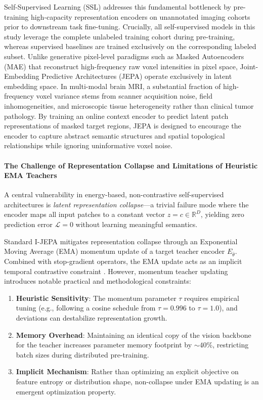\documentclass{article}
\begin{document}
Self-Supervised Learning (SSL) addresses this fundamental bottleneck by pre-training high-capacity representation encoders on unannotated imaging cohorts prior to downstream task fine-tuning. Crucially, all self-supervised models in this study leverage the complete unlabeled training cohort during pre-training, whereas supervised baselines are trained exclusively on the corresponding labeled subset. Unlike generative pixel-level paradigms such as Masked Autoencoders (MAE) \citep{he2022masked} that reconstruct high-frequency raw voxel intensities in pixel space, Joint-Embedding Predictive Architectures (JEPA) \citep{assran2023ijepa} operate exclusively in latent embedding space. In multi-modal brain MRI, a substantial fraction of high-frequency voxel variance stems from scanner acquisition noise, field inhomogeneities, and microscopic tissue heterogeneity rather than clinical tumor pathology. By training an online context encoder to predict latent patch representations of masked target regions, JEPA is designed to encourage the encoder to capture abstract semantic structures and spatial topological relationships while ignoring uninformative voxel noise.

\paragraph{The Challenge of Representation Collapse and Limitations of Heuristic EMA Teachers}
A central vulnerability in energy-based, non-contrastive self-supervised architectures is \emph{latent representation collapse}---a trivial failure mode where the encoder maps all input patches to a constant vector $z = c \in \mathbb{R}^D$, yielding zero prediction error $\mathcal{L} = 0$ without learning meaningful semantics. 

Standard I-JEPA \citep{assran2023ijepa} mitigates representation collapse through an Exponential Moving Average (EMA) momentum update of a target teacher encoder $E_{\bar{\theta}}$. Combined with stop-gradient operators, the EMA update acts as an implicit temporal contrastive constraint \citep{grill2020bootstrap,assran2023ijepa}. However, momentum teacher updating introduces notable practical and methodological constraints:
\begin{enumerate}
    \item \textbf{Heuristic Sensitivity}: The momentum parameter $\tau$ requires empirical tuning (e.g., following a cosine schedule from $\tau=0.996$ to $\tau=1.0$), and deviations can destabilize representation growth.
    \item \textbf{Memory Overhead}: Maintaining an identical copy of the vision backbone for the teacher increases parameter memory footprint by $\sim 40\%$, restricting batch sizes during distributed pre-training.
    \item \textbf{Implicit Mechanism}: Rather than optimizing an explicit objective on feature entropy or distribution shape, non-collapse under EMA updating is an emergent optimization property.
\end{enumerate}
\end{document}
